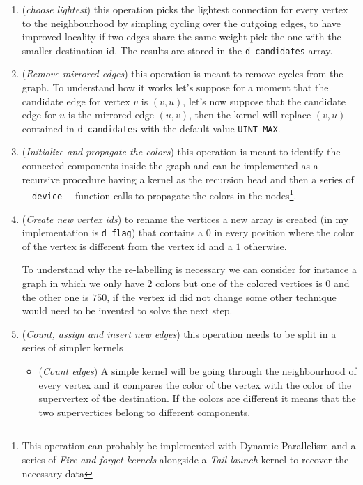 \documentclass[a4paper,10pt]{article}
\begin{document}
\begin{enumerate}
	\item\label{item:choose-lightest} (\textit{choose lightest}) this operation picks the
	lightest connection for every vertex to the neighbourhood by simpling cycling over
	the outgoing edges, to have improved locality if two edges share the same weight pick the one with the smaller destination id. The results are stored in the \texttt{d\_candidates} array.
	\item\label{item:mirror-removal} (\textit{Remove mirrored edges}) this operation is meant to
	remove cycles from the graph. To understand how it works let's suppose for a moment
	that the candidate edge for vertex $v$ is $(v, u)$, let's now suppose that the
	candidate edge for $u$ is the mirrored edge $(u, v)$, then the kernel will replace
	$(v, u)$ contained in \texttt{d\_candidates} with the default value
	\texttt{UINT\_MAX}.
	\item\label{item:coloration} (\textit{Initialize and propagate the colors}) this operation
	is meant to identify the connected components inside the graph and can be
	implemented as a recursive procedure having a kernel as the recursion head and then
	a series of \texttt{\_\_device\_\_} function calls to propagate the colors in the nodes\footnote{This operation can probably be implemented with Dynamic Parallelism and a series of \textit{Fire and forget kernels} alongside a \textit{Tail launch} kernel to recover the necessary data}.
	\item\label{item:vertex-rename} (\textit{Create new vertex ids}) to rename the vertices a
	new array is created (in my implementation is \texttt{d\_flag}) that contains a $0$
	in every position where the color of the vertex is different from the vertex id and
	a $1$ otherwise.

	To understand why the re-labelling is necessary we can consider for instance a graph
	in which we only have $2$ colors but one of the colored vertices is $0$ and the
	other one is $750$, if the vertex id did not change some other technique would need
	to be invented to solve the next step.
	\item\label{item:graph-contraction} (\textit{Count, assign and insert new edges}) this
	operation needs to be split in a series of simpler kernels
	\begin{itemize}
		\item\label{item:count-edges} (\textit{Count edges}) A simple kernel will be
		going through the neighbourhood of every vertex and it compares the
		color of the vertex with the color of the supervertex of the
		destination. If the colors are different it means that the two
		supervertices belong to different components.


\end{itemize}
\end{enumerate}
\end{document}
